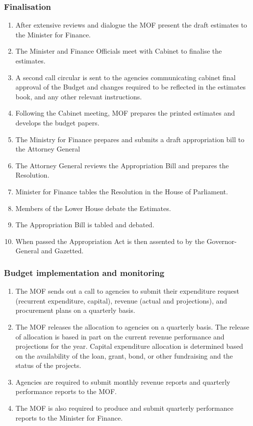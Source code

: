 \documentclass[
  10pt,
]{book}
\begin{document}
\hypertarget{finalisation}{%
\subsubsection{Finalisation}\label{finalisation}}

\begin{enumerate}
\def\labelenumi{\arabic{enumi}.}
\setcounter{enumi}{7}
\item
  After extensive reviews and dialogue the MOF present the draft estimates to the Minister for Finance.
\item
  The Minister and Finance Officials meet with Cabinet to finalise the estimates.
\item
  A second call circular is sent to the agencies communicating cabinet final approval of the Budget and changes required to be reflected in the estimates book, and any other relevant instructions.
\item
  Following the Cabinet meeting, MOF prepares the printed estimates and develops the budget papers.
\item
  The Ministry for Finance prepares and submits a draft appropriation bill to the Attorney General
\item
  The Attorney General reviews the Appropriation Bill and prepares the Resolution.
\item
  Minister for Finance tables the Resolution in the House of Parliament.
\item
  Members of the Lower House debate the Estimates.
\item
  The Appropriation Bill is tabled and debated.
\item
  When passed the Appropriation Act is then assented to by the Governor-General and Gazetted.
\end{enumerate}

\hypertarget{budget-implementation-and-monitoring}{%
\subsubsection{Budget implementation and monitoring}\label{budget-implementation-and-monitoring}}

\begin{enumerate}
\def\labelenumi{\arabic{enumi}.}
\setcounter{enumi}{17}
\item
  The MOF sends out a call to agencies to submit their expenditure request (recurrent expenditure, capital), revenue (actual and projections), and procurement plans on a quarterly basis.
\item
  The MOF releases the allocation to agencies on a quarterly basis. The release of allocation is based in part on the current revenue performance and projections for the year. Capital expenditure allocation is determined based on the availability of the loan, grant, bond, or other fundraising and the status of the projects.
\item
  Agencies are required to submit monthly revenue reports and quarterly performance reports to the MOF.
\item
  The MOF is also required to produce and submit quarterly performance reports to the Minister for Finance.
\end{enumerate}
\end{document}
